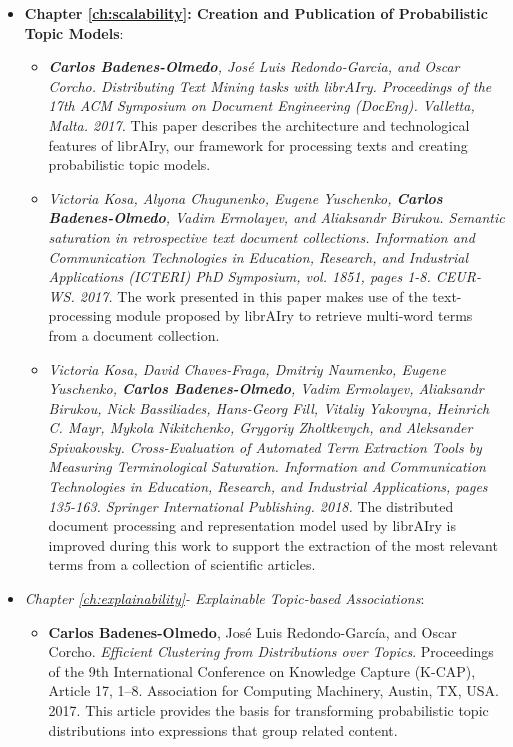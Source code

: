 \begin{itemize}
\item \textbf{Chapter \ref{ch:scalability}: Creation and Publication of Probabilistic Topic Models}:
\begin{itemize}
\item \textit{\textbf{Carlos Badenes-Olmedo}, José Luis Redondo-Garcia, and Oscar Corcho. \textit{Distributing Text Mining tasks with librAIry}. Proceedings of the 17th ACM Symposium on Document Engineering (DocEng). Valletta, Malta. 2017.} This paper describes the architecture and technological features of librAIry, our framework for processing texts and creating probabilistic topic models. 
\item \textit{Victoria Kosa, Alyona Chugunenko, Eugene Yuschenko, \textbf{Carlos Badenes-Olmedo}, Vadim Ermolayev, and Aliaksandr Birukou. \textit{Semantic saturation in retrospective text document collections}. Information and Communication Technologies in Education, Research, and Industrial Applications (ICTERI) PhD Symposium, vol. 1851, pages 1-8. CEUR-WS. 2017.} The work presented in this paper makes use of the text-processing module proposed by librAIry to retrieve multi-word terms from a document collection.
\item \textit{Victoria Kosa, David Chaves-Fraga, Dmitriy Naumenko, Eugene Yuschenko, \textbf{Carlos Badenes-Olmedo}, Vadim Ermolayev, Aliaksandr Birukou, Nick Bassiliades, Hans-Georg Fill, Vitaliy Yakovyna, Heinrich C. Mayr, Mykola Nikitchenko, Grygoriy Zholtkevych, and Aleksander Spivakovsky. \textit{Cross-Evaluation of Automated Term Extraction Tools by Measuring Terminological Saturation}. Information and Communication Technologies in Education, Research, and Industrial Applications, pages 135-163. Springer International Publishing. 2018.} The distributed document processing and representation model used by librAIry is improved during this work to support the extraction of the most relevant terms from a collection of scientific articles.
\end{itemize}
\item \textit{Chapter \ref{ch:explainability}- Explainable Topic-based Associations}:
\begin{itemize}
\item \textbf{Carlos Badenes-Olmedo}, José Luis Redondo-García, and Oscar Corcho. \textit{Efficient Clustering from Distributions over Topics}. Proceedings of the 9th International Conference on Knowledge Capture (K-CAP), Article 17, 1–8. Association for Computing Machinery, Austin, TX, USA. 2017. This article provides the basis for transforming probabilistic topic distributions into expressions that group related content. 

\end{itemize}
\end{itemize}
